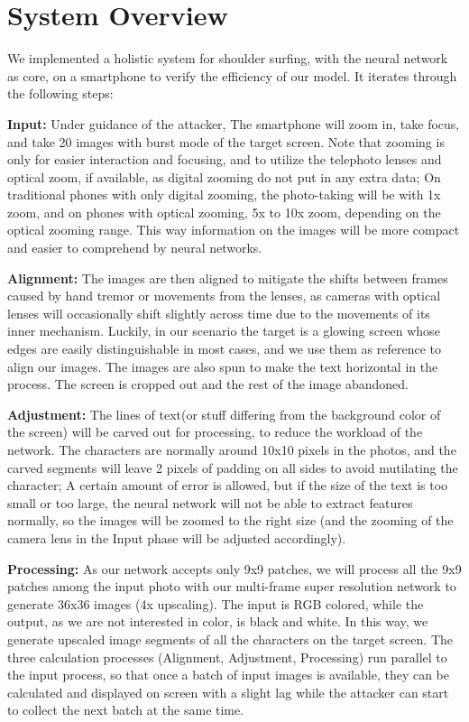 \section{System Overview}
\label{sec-system-overview} 
We implemented a holistic system for shoulder surfing, with the neural network as core, on a smartphone to verify the efficiency of our model. It iterates through the following steps: 

\vspace{1mm}
\noindent
\textbf{Input:} Under guidance of the attacker, The smartphone will zoom in, take focus, and take 20 images with burst mode of the target screen. Note that zooming is only for easier interaction and focusing, and to utilize the telephoto lenses and optical zoom, if available, as digital zooming do not put in any extra data; On traditional phones with only digital zooming, the photo-taking will be with 1x zoom, and on phones with optical zooming, 5x to 10x zoom, depending on the optical zooming range. This way information on the images will be more compact and easier to comprehend by neural networks.

\vspace{1mm}
\noindent
\textbf{Alignment:} The images are then aligned to mitigate the shifts between frames caused by hand tremor or movements from the lenses, as cameras with optical lenses will occasionally shift slightly across time due to the movements of its inner mechanism. Luckily, in our scenario the target is a glowing screen whose edges are easily distinguishable in most cases, and we use them as reference to align our images. The images are also spun to make the text horizontal in the process. The screen is cropped out and the rest of the image abandoned.


\vspace{1mm}
\noindent
\textbf{Adjustment:} The lines of text(or stuff differing from the background color of the screen) will be carved out for processing, to reduce the workload of the network. The characters are normally around 10x10 pixels in the photos, and the carved segments will leave 2 pixels of padding on all sides to avoid mutilating the character; A certain amount of error is allowed, but if the size of the text is too small or too large, the neural network will not be able to extract features normally, so the images will be zoomed to the right size (and the zooming of the camera lens in the Input phase will be adjusted accordingly).


\vspace{1mm}
\noindent
\textbf{Processing:} As our network accepts only 9x9 patches, we will process all the 9x9 patches among the input photo with our multi-frame super resolution network to generate 36x36 images (4x upscaling). The input is RGB colored, while the output, as we are not interested in color, is black and white. In this way, we generate upscaled image segments of all the characters on the target screen. The three calculation processes (Alignment, Adjustment, Processing) run parallel to the input process, so that once a batch of input images is available, they can be calculated and displayed on screen with a slight lag while the attacker can start to collect the next batch at the same time.
		
